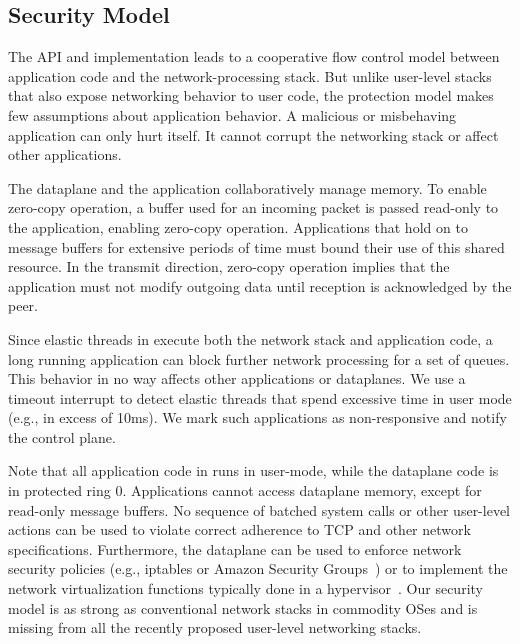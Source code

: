 \subsection{Security Model}
\label{sec:impl:coop}


The \ix API and implementation leads to a cooperative flow control
model between application code and the network-processing stack.  But
unlike user-level stacks that also expose networking behavior to user
code,   the \ix protection model makes few assumptions about
application behavior. A malicious or misbehaving application can only
hurt itself. It cannot corrupt the networking stack or affect other
applications.

The \ix dataplane and the application collaboratively manage
memory. To enable zero-copy operation, a buffer used for an incoming
packet is passed read-only to the application, enabling zero-copy
operation. Applications that hold on to message buffers for extensive
periods of time must bound their use of this shared resource.  In the
transmit direction, zero-copy operation implies that the application
must not modify outgoing data
until reception is
acknowledged by the peer.

Since elastic threads in \ix execute both the network stack and
application code, a long running application can block further network
processing for a set of queues. This behavior in no way affects other
applications or dataplanes. We use a timeout interrupt to detect
elastic threads that spend excessive time in user mode (e.g., in
excess of 10ms). We mark such applications as non-responsive and
notify the control
plane.

Note that all application code in \ix runs in user-mode, while the
dataplane code is in protected ring 0. Applications cannot access
dataplane memory, except for read-only message buffers.  No sequence
of batched system calls or other user-level actions can be used to
violate correct adherence to TCP and other network specifications.
Furthermore, the dataplane can be used to enforce network security
policies (e.g., iptables or Amazon Security
Groups~\cite{url:amazon-sg}) or to implement the network
virtualization functions typically done in a
hypervisor~\cite{nsdi:nsx}. Our security model is as strong as
conventional network stacks in commodity OSes and is missing from all
the recently proposed user-level networking stacks.

